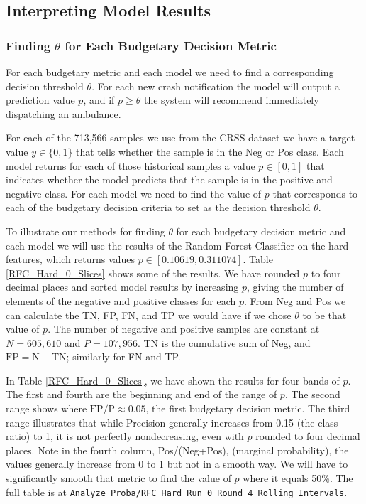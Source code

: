 \subsection{Interpreting Model Results}
\label{interpreting}

\subsubsection{Finding $\theta$ for Each Budgetary Decision Metric}
\label{finding_theta}

For each budgetary metric and each model we need to find a corresponding decision threshold $\theta$.  For each new crash notification the model will output a prediction value $p$, and if $p \ge \theta$ the system will recommend immediately dispatching an ambulance.  

For each of the 713,566 samples we use from the CRSS dataset we have a target value $y \in \{0,1\}$ that tells whether the sample is in the Neg or Pos class.  Each model returns for each of those historical samples a value $p \in [0,1]$ that indicates whether the model predicts that the sample is in the positive and negative class.  For each model we need to find the value of $p$ that corresponds to each of the budgetary decision criteria to set as the decision threshold $\theta$.  

To illustrate our methods for finding $\theta$ for each budgetary decision metric and each model we will use the results of the Random Forest Classifier on the hard features, which returns values  $p \in [0.10619,0.311074]$.  Table \ref{RFC_Hard_0_Slices}  shows some of the results.  We have rounded $p$ to four decimal places and sorted model results by increasing $p$, giving the number of elements of the negative and positive classes for each $p$.  From Neg and Pos we can calculate the TN, FP, FN, and TP we would have if we chose $\theta$ to be that value of $p$.  The number of negative and positive samples are constant at $N=605,610$ and $P=107,956$. TN is the cumulative sum of Neg, and $\text{FP} = \text{N} - \text{TN}$; similarly for FN and TP.  

In Table \ref{RFC_Hard_0_Slices}, we have shown the results for four bands of $p$.  The first and fourth are the beginning and end of the range of $p$.  The second range shows where $\text{FP/P} \approx 0.05$, the first budgetary decision metric.  The third range illustrates that while Precision generally increases from 0.15 (the class ratio) to 1, it is not perfectly nondecreasing, even with $p$ rounded to four decimal places.  Note in the fourth column, Pos/(Neg+Pos), (marginal probability), the values generally increase from 0 to 1 but not in a smooth way.  We will have to significantly smooth that metric to find the value of $p$ where it equals 50\%.  The full table is at 
\verb|Analyze_Proba/RFC_Hard_Run_0_Round_4_Rolling_Intervals|.

